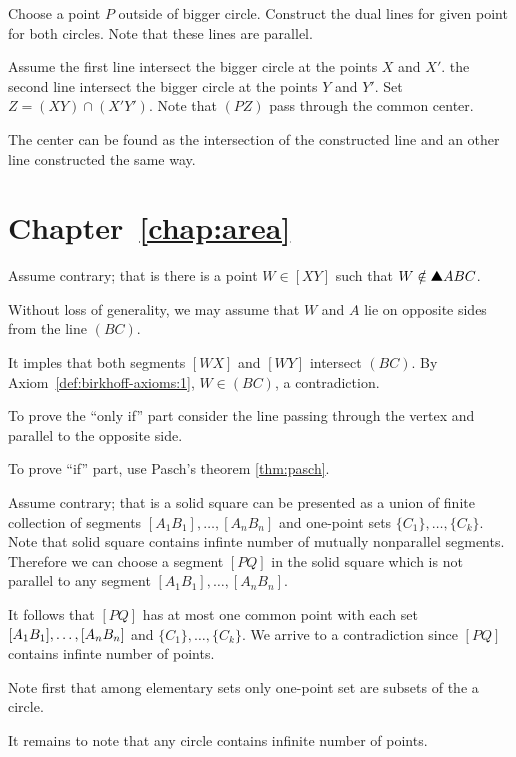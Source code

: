 Choose a point $P$ outside of bigger circle.
Construct the dual lines for given point for both circles.
Note that these lines are parallel. 

Assume the first line intersect the bigger circle at the points $X$ and $X'$.
the second line intersect the bigger circle at the points $Y$ and $Y'$.
Set  $Z=(XY)\cap (X'Y')$.
Note that $(PZ)$ pass through the common center.

The center can be found as the intersection of the constructed line and an other line constructed the same way.

\section*{Chapter~\ref{chap:area}}
\setcounter{eqtn}{0} 

Assume contrary; 
that is there is a point $W\in [XY]$ such that $W\notin\solidtriangle ABC$.

Without loss of generality, we may assume that $W$ and $A$ lie on opposite sides from the line $(BC)$.

It imples that both segments $[WX]$ and $[WY]$ intersect $(BC)$.
By Axiom~\ref{def:birkhoff-axioms:1}, $W\in (BC)$,
a contradiction.

To prove the ``only if'' part consider the line passing through the vertex and parallel to the opposite side.

To prove ``if'' part, use Pasch's theorem \ref{thm:pasch}.

Assume contrary; that is a solid square can be presented as a union of finite collection of segments $[A_1B_1],\dots,[A_nB_n]$
and one-point sets $\{C_1\},\dots,\{C_k\}$.
Note that solid square contains infinte number of mutually nonparallel segments.
Therefore we can choose a segment $[PQ]$ in the solid square 
which is not parallel to any segment $[A_1B_1],\dots,[A_nB_n]$.

It follows that $[PQ]$ has at most one common point with each set  $[A_1B_1],\z\dots,[A_nB_n]$ and $\{C_1\},\dots,\{C_k\}$.
We arrive to a contradiction since $[PQ]$ contains infinte number of points.

Note first that among elementary sets
only one-point set are subsets of the a circle.

It remains to note that any circle contains infinite number of points.



